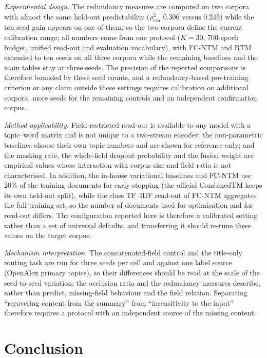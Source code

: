 \documentclass[11pt]{article}
\newcommand{\fcntm}{FC-NTM}
\begin{document}
\emph{Experimental design.} The redundancy measures are computed on two corpora with almost the
same held-out predictability ($\rho^2_{\mathrm{cca}}$ 0.306 versus 0.245) while the ten-seed gain
appears on one of them, so the two corpora define the current calibration range; all numbers come
from one protocol ($K=30$, 700-epoch budget, unified read-out and evaluation vocabulary), with
\fcntm{} and BTM extended to ten seeds on all three corpora while the remaining baselines and the
main tables stay at three seeds. The precision of the reported comparisons is therefore bounded by
these seed counts, and a redundancy-based pre-training criterion or any claim outside these settings
requires calibration on additional corpora, more seeds for the remaining controls and an independent
confirmation corpus.

\emph{Method applicability.} Field-restricted read-out is available to any model with a
topic--word matrix and is not unique to a two-stream encoder; the non-parametric baselines choose
their own topic numbers and are shown for reference only; and the masking rate, the whole-field dropout
probability and the fusion weight are empirical values whose interaction with corpus size and field
ratio is not characterised. In addition, the in-house variational baselines and \fcntm{} use 20\% of the
training documents for early stopping (the official CombinedTM keeps its own held-out split), while
the class TF--IDF read-out of \fcntm{} aggregates the full training set, so the number of documents
used for optimisation and for read-out differs. The configuration reported here is therefore a
calibrated setting rather than a set of universal defaults, and transferring it should re-tune these
values on the target corpus.

\emph{Mechanism interpretation.} The concatenated-field control and the title-only routing task
are run for three seeds per cell and against one label source (OpenAlex primary topics), so their
differences should be read at the scale of the seed-to-seed variation; the occlusion ratio and the
redundancy measures describe, rather than predict, missing-field behaviour and the field relation.
Separating ``recovering content from the summary'' from ``insensitivity to the input'' therefore
requires a protocol with an independent source of the missing content.

\section{Conclusion}
\end{document}
